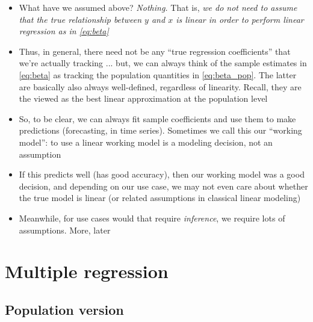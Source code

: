 \documentclass{article}
\begin{document}
\begin{itemize}
\item What have we assumed above? \emph{Nothing.} That is, \emph{we do  
    not need to assume that the true relationship between $y$ and $x$ is linear
    in order to perform linear regression as in \eqref{eq:beta}}

\item Thus, in general, there need not be any ``true regression coefficients'' 
  that we're actually tracking ... but, we can always think of the sample
  estimates  in \eqref{eq:beta} as tracking 
  the population quantities  in
  \eqref{eq:beta_pop}. The latter are basically also always well-defined, 
  regardless of linearity. Recall, they are the viewed as the best linear
  approximation at the population level 

\item So, to be clear, we can always fit sample coefficients  and use them to make predictions (forecasting, in time
  series). Sometimes we call this our ``working model'': to use a linear working
  model is a modeling decision, not an assumption  

\item If this predicts well (has good accuracy), then our working model was a
  good decision, and depending on our use case, we may not even care about
  whether the true model is linear (or related assumptions in classical linear
  modeling) 

\item Meanwhile, for use cases would that require \emph{inference}, we require
  lots of assumptions. More, later
\end{itemize}

\section{Multiple regression}

\subsection{Population version}
\end{document}
